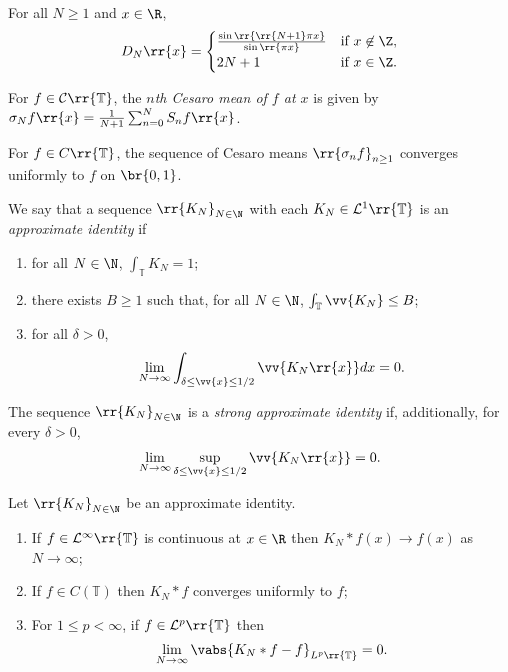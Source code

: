\documentclass{article}
\begin{document}
\begin{lemma}
  For all $N\geq 1$ and $x\in\R$,
  \begin{align*}
    D_N\rr{x} =
    \begin{cases}
      \frac{\sin\rr{\rr{N+1}\pi x}}{\sin\rr{\pi x}} & \text{if }x\not\in\Z,\\
      2N+1 &\text{if }x\in\Z.
    \end{cases}
  \end{align*}
\end{lemma}

\begin{definition}
  For $f\in\mathcal C\rr{\mathbb T}$, the \emph{$n$th Cesaro mean of $f$ at
  $x$} is given by $\sigma_N f\rr{x} = \frac{1}{N+1} \sum_{n=0}^N S_n f\rr{x}$.
\end{definition}

\begin{theorem}
  For $f\in C\rr{\mathbb T}$, the sequence of Cesaro means $\rr{\sigma_n f}_{n\geq 1}$
  converges uniformly to $f$ on $\br{0,1}$.
\end{theorem}

\begin{definition}
  We say that a sequence $\rr{K_N}_{N\in\N}$ with each $K_N\in\mathcal L^1\rr{\mathbb T}$
  is an \emph{approximate identity} if
  \begin{enumerate}
    \item for all $N\in\N$, $\int_{\mathbb T} K_N = 1$;
    \item there exists $B\geq 1$ such that, for all $N\in\N$, $\int_{\mathbb T}\vv{K_N}\leq B$;
    \item for all $\delta>0$,
      \begin{align*}
        \lim_{N\to\infty}\int_{\delta\leq\vv{x}\leq 1/2}\vv{K_N\rr{x}} dx = 0.
      \end{align*}
  \end{enumerate}
  The sequence $\rr{K_N}_{N\in\N}$ is a \emph{strong approximate identity} if, additionally,
  for every $\delta>0$,
  \begin{align*}
    \lim_{N\to\infty} \sup_{\delta\leq\vv{x}\leq 1/2}\vv{K_N\rr{x}}=0.
  \end{align*}
\end{definition}

\begin{theorem}
  Let $\rr{K_N}_{N\in\N}$ be an approximate identity.
  \begin{enumerate}
    \item If $f\in\mathcal L^\infty\rr{\mathbb T}$ is continuous at $x\in\R$ then
      $K_N * f(x) \to f(x)$ as $N\to\infty$;
    \item If $f\in C(\mathbb T)$ then $K_N*f$ converges uniformly to $f$;
    \item For $1\leq p<\infty$, if $f\in\mathcal L^p\rr{\mathbb T}$ then
      \begin{align*}
        \lim_{N\to\infty}\vabs{K_N*f-f}_{L^p\rr{\mathbb T}}=0.
      \end{align*}
  \end{enumerate}
\end{theorem}
\end{document}
